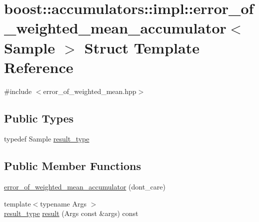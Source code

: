 \hypertarget{structboost_1_1accumulators_1_1impl_1_1error__of__weighted__mean__accumulator}{\section{boost\-:\-:accumulators\-:\-:impl\-:\-:error\-\_\-of\-\_\-weighted\-\_\-mean\-\_\-accumulator$<$ Sample $>$ Struct Template Reference}
\label{structboost_1_1accumulators_1_1impl_1_1error__of__weighted__mean__accumulator}
}


{\ttfamily \#include $<$error\-\_\-of\-\_\-weighted\-\_\-mean.\-hpp$>$}

\subsection*{Public Types}
\begin{DoxyCompactItemize}
\item 
typedef Sample \hyperlink{structboost_1_1accumulators_1_1impl_1_1error__of__weighted__mean__accumulator_ab3d7f50fee0fc4db6027b1c6d3be5452}{result\-\_\-type}
\end{DoxyCompactItemize}
\subsection*{Public Member Functions}
\begin{DoxyCompactItemize}
\item 
\hyperlink{structboost_1_1accumulators_1_1impl_1_1error__of__weighted__mean__accumulator_a8a36180d9550b410b62049742f63ad39}{error\-\_\-of\-\_\-weighted\-\_\-mean\-\_\-accumulator} (dont\-\_\-care)
\item 
{\footnotesize template$<$typename Args $>$ }\\\hyperlink{structboost_1_1accumulators_1_1impl_1_1error__of__weighted__mean__accumulator_ab3d7f50fee0fc4db6027b1c6d3be5452}{result\-\_\-type} \hyperlink{structboost_1_1accumulators_1_1impl_1_1error__of__weighted__mean__accumulator_a5178718380e2f52c0b14b3a82eb63ce7}{result} (Args const \&args) const 
\end{DoxyCompactItemize}


